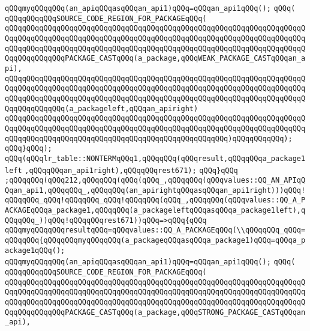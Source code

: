 \verb|qQQqmyqQQqqQQq(an_apiqQQqasqQQqan_api1)qQQq=qQQqan_api1qQQq();|\newline
\verb|qQQq(|\newline
\verb|qQQqqQQqqQQqSOURCE_CODE_REGION_FOR_PACKAGEqQQq(|\newline
\verb|qQQqqQQqqQQqqQQqqQQqqQQqqQQqqQQqqQQqqQQqqQQqqQQqqQQqqQQqqQQqqQQqqQQqqQQqqQQqqQQqqQQqqQQqqQQqqQQqqQQqqQQqqQQqqQQqqQQqqQQqqQQqqQQqqQQqqQQqqQQqqQQqqQQqqQQqqQQqqQQqqQQqqQQqqQQqqQQqqQQqqQQqqQQqqQQqqQQqqQQqqQQqqQQqqQQqqQQqqQQqqQQqPACKAGE_CASTqQQq(a_package,qQQqWEAK_PACKAGE_CASTqQQqan_api),|\newline
\verb|qQQqqQQqqQQqqQQqqQQqqQQqqQQqqQQqqQQqqQQqqQQqqQQqqQQqqQQqqQQqqQQqqQQqqQQqqQQqqQQqqQQqqQQqqQQqqQQqqQQqqQQqqQQqqQQqqQQqqQQqqQQqqQQqqQQqqQQqqQQqqQQqqQQqqQQqqQQqqQQqqQQqqQQqqQQqqQQqqQQqqQQqqQQqqQQqqQQqqQQqqQQqqQQqqQQqqQQqqQQqqQQq(a_packageleft,qQQqan_apiright)|\newline
\verb|qQQqqQQqqQQqqQQqqQQqqQQqqQQqqQQqqQQqqQQqqQQqqQQqqQQqqQQqqQQqqQQqqQQqqQQqqQQqqQQqqQQqqQQqqQQqqQQqqQQqqQQqqQQqqQQqqQQqqQQqqQQqqQQqqQQqqQQqqQQqqQQqqQQqqQQqqQQqqQQqqQQqqQQqqQQqqQQqqQQqqQQqqQQqqQQq)qQQqqQQqqQQq);|\newline
\verb|qQQq}qQQq);|\newline
\verb|qQQq(qQQqlr_table::NONTERMqQQq1,qQQqqQQq(qQQqresult,qQQqqQQqa_package1left|\newline
\verb|,qQQqqQQqan_api1right),qQQqqQQqrest671);|\newline
\verb|qQQq}qQQq|\newline
\verb|;qQQqqQQq(qQQq212,qQQqqQQq(qQQq(qQQq_,qQQqqQQq(qQQqvalues::QQ_AN_APIqQQqan_api1,qQQqqQQq_,qQQqqQQq(an_apirightqQQqasqQQqan_api1right)))qQQq!qQQqqQQq_qQQq!qQQqqQQq_qQQq!qQQqqQQq(qQQq_,qQQqqQQq(qQQqvalues::QQ_A_PACKAGEqQQqa_package1,qQQqqQQq(a_packageleftqQQqasqQQqa_package1left),qQQqqQQq_))qQQq!qQQqqQQqrest671))qQQq=>qQQq{qQQq|\newline
\verb|qQQqmyqQQqqQQqresultqQQq=qQQqvalues::QQ_A_PACKAGEqQQq(\\qQQqqQQq_qQQq=qQQqqQQq{qQQqqQQqmyqQQqqQQq(a_packageqQQqasqQQqa_package1)qQQq=qQQqa_package1qQQq();|\newline
\verb|qQQqmyqQQqqQQq(an_apiqQQqasqQQqan_api1)qQQq=qQQqan_api1qQQq();|\newline
\verb|qQQq(|\newline
\verb|qQQqqQQqqQQqSOURCE_CODE_REGION_FOR_PACKAGEqQQq(|\newline
\verb|qQQqqQQqqQQqqQQqqQQqqQQqqQQqqQQqqQQqqQQqqQQqqQQqqQQqqQQqqQQqqQQqqQQqqQQqqQQqqQQqqQQqqQQqqQQqqQQqqQQqqQQqqQQqqQQqqQQqqQQqqQQqqQQqqQQqqQQqqQQqqQQqqQQqqQQqqQQqqQQqqQQqqQQqqQQqqQQqqQQqqQQqqQQqqQQqqQQqqQQqqQQqqQQqqQQqqQQqqQQqqQQqPACKAGE_CASTqQQq(a_package,qQQqSTRONG_PACKAGE_CASTqQQqan_api),|\newline
